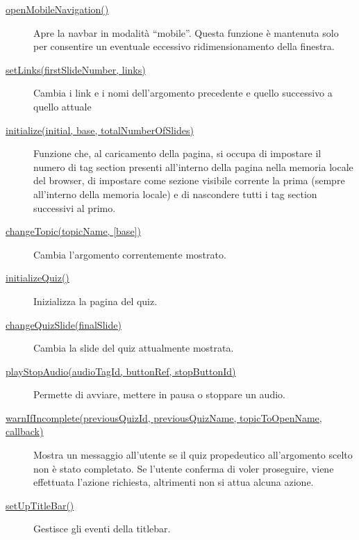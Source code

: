 \begin{description}
\item[{ \protect\hyperlink{openMobileNavigation}{openMobileNavigation()}
}]
Apre la navbar in modalità ``mobile''. Questa funzione è mantenuta solo
per consentire un eventuale eccessivo ridimensionamento della finestra.
\item[{ \protect\hyperlink{setLinks}{setLinks(firstSlideNumber, links)}
}]
Cambia i link e i nomi dell'argomento precedente e quello successivo a
quello attuale
\item[{ \protect\hyperlink{initialize}{initialize(initial, base,
totalNumberOfSlides)} }]
Funzione che, al caricamento della pagina, si occupa di impostare il
numero di tag section presenti all'interno della pagina nella memoria
locale del browser, di impostare come sezione visibile corrente la prima
(sempre all'interno della memoria locale) e di nascondere tutti i tag
section successivi al primo.
\item[{ \protect\hyperlink{changeTopic}{changeTopic(topicName,
{[}base{]})} }]
Cambia l'argomento correntemente mostrato.
\item[{ \protect\hyperlink{initializeQuiz}{initializeQuiz()} }]
Inizializza la pagina del quiz.
\item[{ \protect\hyperlink{changeQuizSlide}{changeQuizSlide(finalSlide)}
}]
Cambia la slide del quiz attualmente mostrata.
\item[{ \protect\hyperlink{playStopAudio}{playStopAudio(audioTagId,
buttonRef, stopButtonId)} }]
Permette di avviare, mettere in pausa o stoppare un audio.
\item[{
\protect\hyperlink{warnIfIncomplete}{warnIfIncomplete(previousQuizId,
previousQuizName, topicToOpenName, callback)} }]
Mostra un messaggio all'utente se il quiz propedeutico all'argomento
scelto non è stato completato. Se l'utente conferma di voler proseguire,
viene effettuata l'azione richiesta, altrimenti non si attua alcuna
azione.
\item[{ \protect\hyperlink{setUpTitleBar}{setUpTitleBar()} }]
Gestisce gli eventi della titlebar.


\end{description}
